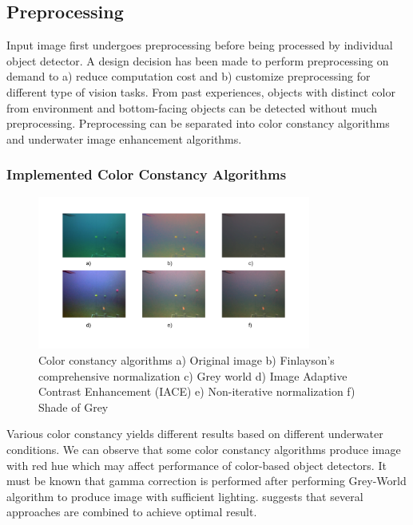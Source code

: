 \documentclass[fypca]{socreport}
\begin{document}
\subsection{Preprocessing} 
Input image first undergoes preprocessing before being processed by individual object detector. A design decision has been made to perform preprocessing on demand to a) reduce computation cost and b) customize preprocessing for different type of vision tasks. From past experiences, objects with distinct color from environment and bottom-facing objects can be detected without much preprocessing. Preprocessing can be separated into color constancy algorithms and underwater image enhancement algorithms. 

\subsubsection{Implemented Color Constancy Algorithms}
    \begin{figure}[h]
    \centering
            \includegraphics[width=0.8\textwidth, height=0.3\textheight]{color_constancy.png}
            \caption{Color constancy algorithms a) Original image b) Finlayson's comprehensive normalization c) Grey world d) Image Adaptive Contrast Enhancement (IACE) e) Non-iterative normalization f) Shade of Grey }
            \label{fig:color_constancy}
    \end{figure}
Various color constancy yields different results based on different underwater conditions. We can observe that some color constancy algorithms produce image with red hue which may affect performance of color-based object detectors. It must be known that gamma correction is performed after performing Grey-World algorithm to produce image with sufficient lighting.  suggests that several approaches are combined to achieve optimal result. 
\end{document}
